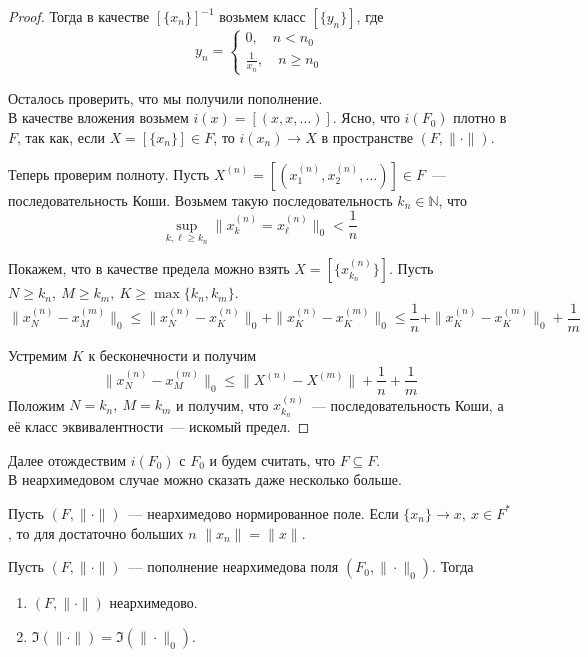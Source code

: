 \documentclass[11pt]{article}
\begin{document}
\begin{proof}
        Тогда в качестве $[\{ x_n \}]^{-1}$ возьмем класс $[\{ y_n \}]$, где
        \[ y_n = \begin{cases} 0,\quad n < n_0 \\ \frac{1}{x_n}, \quad n \ge n_0 \end{cases}\]

        Осталось проверить, что мы получили пополнение. \\
        В качестве вложения возьмем $i(x) = [(x, x, \ldots)]$. Ясно, что $i(F_0)$ плотно в $F$, так как, если
        $X = [\{ x_n \}] \in F$, то $i(x_n) \to X$ в пространстве $(F, \| \cdot \| )$.

        Теперь проверим полноту. Пусть $X^{(n)} = [( x_1^{(n)}, x_2^{(n)}, \ldots ) ] \in F$~--- последовательность Коши.
        Возьмем такую последовательность $k_n \in \mathbb{N}$, что
        \[ \sup\limits_{k, \ell \ge k_n} \| x_k^{(n)} = x_{\ell}^{(n)}\|_0 < \frac{1}{n} \]

        Покажем, что в качестве предела можно взять $X = [ \{ x_{k_n}^{(n)} \}]$. Пусть $N \ge k_n, \ M \ge k_m, \ K \ge \max\{ k_n, k_m \}$.
        \[ \| x_N^{(n)} - x_M^{(m)}\|_0 \le \| x_N^{(n)} - x_K^{(n)}\|_0 + \| x_K^{(n)} - x_K^{(m)}\|_0 \le \frac{1}{n} + \| x_K^{(n)} - x_K^{(m)}\|_0 + \frac{1}{m} \]

        Устремим $K$ к бесконечности и получим
        \[ \| x_N^{(n)} - x_M^{(m)} \|_0 \le \| X^{(n)} - X^{(m)}\| + \frac{1}{n} + \frac{1}{m} \]
        Положим $N = k_{n}, \ M = k_m$ и получим, что $x_{k_n}^{(n)}$~--- последовательность Коши, а её класс эквивалентности~--- искомый предел.
    \end{proof}

    Далее отождествим $i(F_0)$ с $F_0$ и будем считать, что $F \subseteq F$.\\

    В неархимедовом случае можно сказать даже несколько больше.

   Пусть $(F, \| \cdot \|)$~--- неархимедово нормированное поле. Если  $\{ x_n \} \to x, \ x \in F^{*}$, то для достаточно больших
    $n$ $\| x_n \| = \| x \|$.

   \begin{lemma}
       Пусть $(F, \| \cdot \|)$~--- пополнение неархимедова поля $(F_0, \| \cdot \|_0)$. Тогда
       \begin{enumerate}
           \item $(F, \| \cdot \|)$ неархимедово.

           \item $\Im(\| \cdot \|) = \Im(\| \cdot \|_0)$.
       \end{enumerate}
   \end{lemma}
\end{document}
